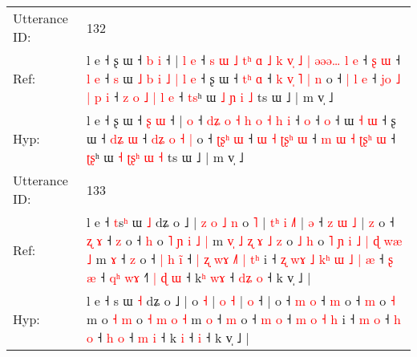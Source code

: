 \documentclass[10pt]{article}
\DeclareRobustCommand{\hl}[1]{{\textcolor{red}{#1}}}
\begin{document}
\begin{longtable}{ll}
 \\
\midrule
Utterance ID: & 132 \\
Ref: & l e ˧ ʂ ɯ ˧ \hl{b} \hl{i} ˧ |\hl{ }\hl{l} \hl{e} ˧\hl{ }\hl{s}\hl{ }\hl{ɯ}\hl{ }\hl{˩}\hl{ }\hl{t}\hl{ʰ} \hl{ɑ}\hl{ }\hl{˩} \hl{k} \hl{v}\hl{̩} \hl{˩} \hl{|} \hl{ə}\hl{ə}\hl{ə}\hl{…} \hl{l} \hl{e} ˧\hl{ }\hl{ʂ} \hl{ɯ} ˧\hl{ }\hl{l} \hl{e} ˧\hl{ }\hl{s} ɯ\hl{ }\hl{˩}\hl{ }\hl{b}\hl{ }\hl{i}\hl{ }\hl{˩}\hl{ }\hl{|} \hl{l} \hl{e} ˧ ʂ ɯ ˧ \hl{t}\hl{ʰ} \hl{ɑ} ˧\hl{ }\hl{k} \hl{v}\hl{̩} \hl{˥} \hl{|} \hl{n} o ˧ \hl{|}\hl{ }\hl{l} \hl{e} ˧ \hl{j}\hl{o} \hl{˩} \hl{|}\hl{ }\hl{p} \hl{i} ˧ \hl{z} \hl{o} \hl{˩} \hl{|}\hl{ }\hl{l} \hl{e} ˧ \hl{t}\hl{s}ʰ ɯ \hl{˩} \hl{}\hl{}\hl{ɲ} \hl{i} \hl{˩} ts ɯ ˩ | m v̩ ˩
 \\
Hyp: & l e ˧ ʂ ɯ ˧ \hl{ʂ} \hl{ɯ} ˧ |\hl{}\hl{} \hl{o} ˧\hl{}\hl{}\hl{}\hl{}\hl{}\hl{}\hl{}\hl{}\hl{} \hl{}\hl{d}\hl{ʑ} \hl{o} \hl{}\hl{˧} \hl{h} \hl{o} \hl{}\hl{}\hl{}\hl{˧} \hl{h} \hl{i} ˧\hl{}\hl{} \hl{o} ˧\hl{}\hl{} \hl{o} ˧\hl{}\hl{} ɯ\hl{}\hl{}\hl{}\hl{}\hl{}\hl{}\hl{}\hl{}\hl{}\hl{} \hl{˧} \hl{ɯ} ˧ ʂ ɯ ˧ \hl{d}\hl{ʑ} \hl{ɯ} ˧\hl{}\hl{} \hl{d}\hl{ʑ} \hl{o} \hl{˧} \hl{|} o ˧ \hl{ʈ}\hl{ʂ}\hl{ʰ} \hl{ɯ} ˧ \hl{}\hl{ɯ} \hl{˧} \hl{ʈ}\hl{ʂ}\hl{ʰ} \hl{ɯ} ˧ \hl{m} \hl{ɯ} \hl{˧} \hl{ʈ}\hl{ʂ}\hl{ʰ} \hl{ɯ} ˧ \hl{ʈ}\hl{ʂ}ʰ ɯ \hl{˧} \hl{ʈ}\hl{ʂ}\hl{ʰ} \hl{ɯ} \hl{˧} ts ɯ ˩ | m v̩ ˩
 \\
\midrule
Utterance ID: & 133 \\
Ref: & l e ˧ \hl{t}s\hl{ʰ} ɯ \hl{˩} dʑ o ˩ |\hl{ }\hl{z}\hl{ }\hl{o}\hl{ }\hl{˩}\hl{ }\hl{n} o \hl{˥} |\hl{ }\hl{t}\hl{ʰ} \hl{i} \hl{˩}\hl{˥} | \hl{ə} ˧\hl{ }\hl{z}\hl{ }\hl{ɯ}\hl{ }\hl{˩} |\hl{ }\hl{z} o ˧ \hl{ʐ} \hl{ɤ} ˧ \hl{z} o ˧ \hl{h} o\hl{ }\hl{˥}\hl{ }\hl{ɲ}\hl{ }\hl{i}\hl{ }\hl{˩} \hl{|} m\hl{ }\hl{v}\hl{̩}\hl{ }\hl{˩}\hl{ }\hl{ʐ}\hl{ }\hl{ɤ}\hl{ }\hl{˩}\hl{ }\hl{z} o \hl{˩} \hl{h} o\hl{ }\hl{˥}\hl{ }\hl{ɲ}\hl{ }\hl{i}\hl{ }\hl{˩} \hl{|} \hl{ɖ} \hl{w}\hl{æ} \hl{˩} m \hl{ɤ} ˧ \hl{z} o ˧\hl{ }\hl{|} \hl{h} \hl{i}\hl{̃} ˧\hl{ }\hl{|}\hl{ }\hl{ʐ} \hl{w}\hl{ɤ} \hl{˩}\hl{˥} \hl{|} \hl{t}\hl{ʰ} i ˧\hl{ }\hl{ʐ}\hl{ }\hl{w}\hl{ɤ}\hl{ }\hl{˩}\hl{ }\hl{k}\hl{ʰ}\hl{ }\hl{ɯ}\hl{ }\hl{˩} \hl{|} \hl{æ} ˧ \hl{ʂ} \hl{æ} ˧ \hl{q}\hl{ʰ} \hl{w}\hl{ɤ} ˧\hl{˥}\hl{ }\hl{|} \hl{ɖ} \hl{ɯ} ˧ k\hl{ʰ} \hl{w}\hl{ɤ} ˧\hl{ }\hl{d}\hl{ʑ} \hl{o} ˧ k v̩ ˩ |
 \\
Hyp: & l e ˧ \hl{}s\hl{} ɯ \hl{˧} dʑ o ˩ |\hl{}\hl{}\hl{}\hl{}\hl{}\hl{}\hl{}\hl{} o \hl{˧} |\hl{}\hl{}\hl{} \hl{o} \hl{}\hl{˧} | \hl{o} ˧\hl{}\hl{}\hl{}\hl{}\hl{}\hl{} |\hl{}\hl{} o ˧ \hl{m} \hl{o} ˧ \hl{m} o ˧ \hl{m} o\hl{}\hl{}\hl{}\hl{}\hl{}\hl{}\hl{}\hl{} \hl{˧} m\hl{}\hl{}\hl{}\hl{}\hl{}\hl{}\hl{}\hl{}\hl{}\hl{}\hl{}\hl{}\hl{} o \hl{˧} \hl{m} o\hl{}\hl{}\hl{}\hl{}\hl{}\hl{}\hl{}\hl{} \hl{˧} \hl{m} \hl{}\hl{o} \hl{˧} m \hl{o} ˧ \hl{m} o ˧\hl{}\hl{} \hl{m} \hl{}\hl{o} ˧\hl{}\hl{}\hl{}\hl{} \hl{}\hl{m} \hl{}\hl{o} \hl{˧} \hl{}\hl{h} i ˧\hl{}\hl{}\hl{}\hl{}\hl{}\hl{}\hl{}\hl{}\hl{}\hl{}\hl{}\hl{}\hl{}\hl{} \hl{m} \hl{o} ˧ \hl{h} \hl{o} ˧ \hl{}\hl{h} \hl{}\hl{o} ˧\hl{}\hl{}\hl{} \hl{m} \hl{i} ˧ k\hl{} \hl{}\hl{i} ˧\hl{}\hl{}\hl{} \hl{i} ˧ k v̩ ˩ |

\end{longtable}
\end{document}
